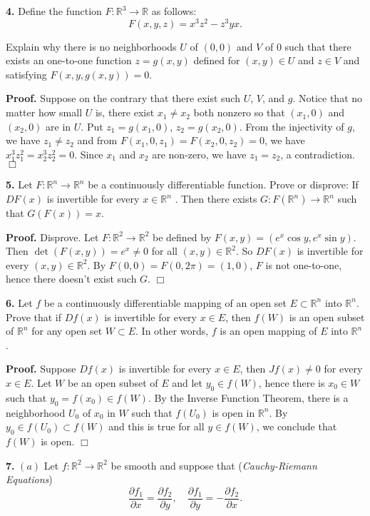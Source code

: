 \documentclass{article}
\begin{document}
    \textbf{4.} Define the function $F : \mathbb{R}^3 \to \mathbb{R}$ as
follows: \[F (x, y, z) = x^3 z^2 − z^3 yx.\]

Explain why there is no neighborhoods $U$ of $(0, 0)$ and $V$ of $0$
such that there exists an one-to-one function $z = g(x, y)$ defined for
$(x, y) \in U$ and $z \in V$ and satisfying $F (x, y, g(x, y)) = 0$.

    \textbf{Proof.} Suppose on the contrary that there exist such $U$, $V$,
and $g$. Notice that no matter how small $U$ is, there exist
$x_1\neq x_2$ both nonzero so that $(x_1, 0)$ and $(x_2, 0)$ are in $U$.
Put $z_1 = g(x_1, 0)$, $z_2 = g(x_2, 0)$. From the injectivity of $g$,
we have $z_1 \ne z_2$ and from $F(x_1,0,z_1)= F(x_2,0,z_2)= 0$, we have
$x_1^3z_1^2 = x_2^3z_2^2 = 0$. Since $x_1$ and $x_2$ are non-zero, we
have $z_1=z_2$, a contradiction. $\Box$

    \textbf{5.} Let $F : \mathbb{R}^n \to \mathbb{R}^n$ be a continuously
differentiable function. Prove or disprove: If $DF (x)$ is invertible
for every $x \in \mathbb{R}^n$ . Then there exists
$G : F (\mathbb{R}^n ) \to \mathbb{R}^n$ such that $G (F(x)) = x$.

    \textbf{Proof.} Disprove. Let $F: \mathbb{R}^2 \to \mathbb{R}^2$ be
defined by $F(x,y) = (e^x\cos y, e^x \sin y)$. Then
$\det(F(x,y)) = e^x \ne 0$ for all $(x,y) \in \mathbb{R}^2$. So $DF(x)$
is invertible for every $(x,y) \in \mathbb{R}^2$. By
$F(0, 0) = F(0,2\pi)=(1,0)$, $F$ is not one-to-one, hence there doesn't
exist such $G$. $\Box$

    \textbf{6.} Let $f$ be a continuously differentiable mapping of an open
set $E \subset \mathbb{R}^n$ into $\mathbb{R}^n$. Prove that if $Df (x)$
is invertible for every $x\in E$, then $f (W )$ is an open subset of
$\mathbb{R}^n$ for any open set $W \subset E$. In other words, $f$ is an
open mapping of $E$ into $\mathbb{R}^n$.

    \textbf{Proof.} Suppose $Df(x)$ is invertible for every $x\in E$, then
$Jf(x) \ne 0$ for every $x\in E$. Let $W$ be an open subset of $E$ and
let $y_0 \in f(W)$, hence there is $x_0 \in W$ such that
$y_0 = f(x_0) \in f(W)$. By the Inverse Function Theorem, there is a
neighborhood $U_0$ of $x_0$ in $W$ such that $f(U_0)$ is open in
$\mathbb{R}^n$. By $y_0 \in f(U_0) \subset f(W)$ and this is true for
all $y \in f(W)$, we conclude that $f(W)$ is open. $\Box$

    \textbf{7.} $(a)$ Let $f : \mathbb{R}^2 \to \mathbb{R}^2$ be smooth and
suppose that (\emph{Cauchy-Riemann Equations})
\[ \frac{\partial f_1}{\partial x} =  \frac{\partial f_2}{\partial y},\quad  \frac{\partial f_1}{\partial y}=- \frac{\partial f_2}{\partial x}.\]
\end{document}
